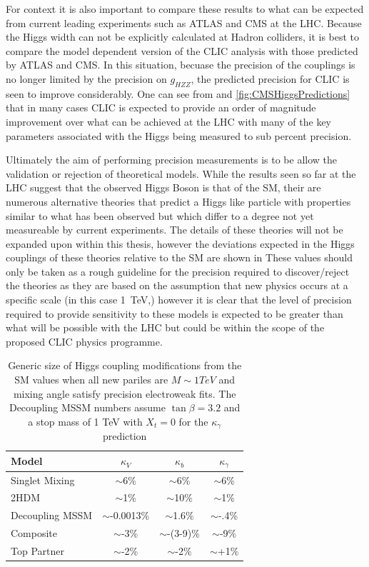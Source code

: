 For context it is also important to compare these results to what can be expected from current leading experiments such as ATLAS and CMS at the LHC. Because the Higgs width can not be explicitly calculated at Hadron colliders, it is best to compare the model dependent version of the CLIC analysis with those predicted by ATLAS and CMS. In this situation, becuase the precision of the couplings is no longer limited by the precision on $g_{HZZ}$, the predicted precision for CLIC is seen to improve considerably. One can see from  and \ref{fig:CMSHiggsPredictions} that in many cases CLIC is expected to provide an order of magnitude improvement over what can be achieved at the LHC with many of the key parameters associated with the Higgs being measured to sub percent precision.

Ultimately the aim of performing precision measurements is to be allow the validation or rejection of theoretical models. While the results seen so far at the LHC suggest that the observed Higgs Boson is that of the \ac{SM}, their are numerous alternative theories that predict a Higgs like particle with properties similar to what has been observed but which differ to a degree not yet measureable by current experiments. The details of these theories will not be expanded upon within this thesis, however the deviations expected in the Higgs couplings of these theories relative to the \ac{SM} are shown in  These values should only be taken as a rough guideline for the precision required to discover/reject the theories as they are based on the assumption that new physics occurs at a specific scale (in this case 1~TeV,) however it is clear that the level of precision required to provide sensitivity to these models is expected to be greater than what will be possible with the LHC but could be within the scope of the proposed CLIC physics programme.  

\begin{table}
  \centering
  \begin{tabular}{l c c c}
    \toprule
    \toprule
    Model  & $\kappa_V$ & $\kappa_b$ & $\kappa_\gamma$  \\
    \midrule
    Singlet Mixing & $\sim$6\% & $\sim$6\%  & $\sim$6\% \\
    2HDM & $\sim$1\% & $\sim$10\%  & $\sim$1\% \\
    Decoupling MSSM & $\sim$-0.0013\% & $\sim$1.6\%  & $\sim$-.4\% \\
    Composite & $\sim$-3\% & $\sim$-(3-9)\%  & $\sim$-9\% \\
    Top Partner & $\sim$-2\% & $\sim$-2\%  & $\sim$+1\% \\
    \bottomrule
    \bottomrule
  \end{tabular}
  \caption[Predicted Higgs Coupling Modifications for BSM theories]{Generic size of Higgs coupling modifications from the \ac{SM} values when all new pariles are $M\sim 1 TeV$ and mixing angle satisfy precision electroweak fits. The Decoupling MSSM numbers assume $\tan\beta = 3.2$ and a stop mass of 1 TeV with $X_t =0$ for the $\kappa_\gamma$ prediction \cite{Dawson:2013bba}}
  \label{table:snowmass}
\end{table}

